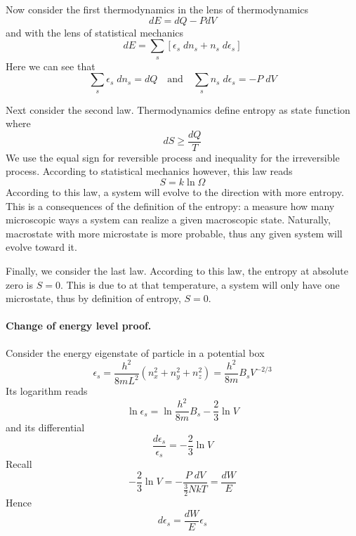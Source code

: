 \documentclass[../../../Main.tex]{subfiles}
\begin{document}
Now consider the first thermodynamics in the lens of thermodynamics
\begin{equation*}
    dE=dQ-PdV
\end{equation*}
and with the lens of statistical mechanics
\begin{equation*}
    dE=\sum_s\left[\epsilon_s\;dn_s+n_s\;d\epsilon_s\right]
\end{equation*}
Here we can see that 
\begin{equation*}
    \sum_s\epsilon_s \;dn_s=dQ \quad\text{and}\quad\sum_s n_s\;d\epsilon_s =-P\;dV
\end{equation*}

Next consider the second law. Thermodynamics define entropy as state function where 
\begin{equation*}
    dS\geq\frac{dQ}{T}
\end{equation*}
We use the equal sign for reversible process and inequality for the irreversible process. According to statistical mechanics however, this law reads 
\begin{equation*}
    S=k\ln\Omega
\end{equation*}
According to this law, a system will evolve to the direction with more entropy. This is a consequences of the definition of the entropy: a measure how many microscopic ways a system can realize a given macroscopic state. Naturally, macrostate with more microstate is more probable, thus any given system will evolve toward it.

Finally, we consider the last law. According to this law, the entropy at absolute zero is $S=0$. This is due to at that temperature, a system will only have one microstate, thus by definition of entropy, $S=0$.

\paragraph*{Change of energy level proof.} Consider the energy eigenstate of particle in a potential box
\begin{equation*}
    \epsilon_s=\frac{h^2}{8mL^2}(n_x^2+n_y^2+n_z^2)=\frac{h^2}{8m}B_sV^{-2/3}
\end{equation*}
Its logarithm reads 
\begin{equation*}
    \ln \epsilon_s=\ln\frac{h^2}{8m}B_s -\frac{2}{3}\ln V
\end{equation*}
and its differential
\begin{equation*}
    \frac{d\epsilon_s}{\epsilon_s}=-\frac{2}{3}\ln V
\end{equation*}
Recall 
\begin{equation*}
    -\frac{2}{3}\ln V=-\frac{P\;dV}{\frac{3}{2}NkT}=\frac{dW}{E}
\end{equation*}
Hence 
\begin{equation*}
    d\epsilon_s=\frac{dW}{E}\epsilon_s
\end{equation*}
\end{document}
